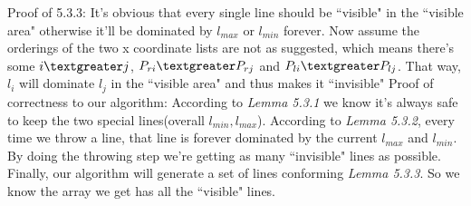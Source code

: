 \documentclass[11pt]{article}
\begin{document}
	\newline
	Proof of 5.3.3: It's obvious that every single line should be ``visible" in the ``visible area" otherwise it'll be dominated by $l_{max}$ or $l_{min}$ forever. Now assume the orderings of the two x coordinate lists are not as suggested, which means there's some $i\textgreater j$, $P_{ri}\textgreater P_{rj}$ and $P_{li}\textgreater P_{lj}$. That way, $l_{i}$ will dominate $l_{j}$ in the ``visible area" and thus makes it ``invisible"\newline
	\newline
	Proof of correctness to our algorithm: According to \textit{Lemma 5.3.1} we know it's always safe to keep the two special lines(overall $l_{min}, l_{max}$). According to \textit{Lemma 5.3.2}, every time we throw a line, that line is forever dominated by the current $l_{max}$ and $l_{min}$. By doing the throwing step we're getting as many ``invisible" lines as possible. Finally, our algorithm will generate a set of lines conforming \textit{Lemma 5.3.3}. So we know the array we get has all the ``visible" lines.
	
\end{document}
